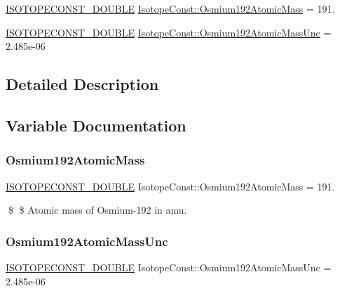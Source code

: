 \begin{DoxyCompactItemize}
\item 
\mbox{\hyperlink{group___isotope_const-_macros_ga8f45a7272ce02c0b4c65c44636ed719a}{I\+S\+O\+T\+O\+P\+E\+C\+O\+N\+S\+T\+\_\+\+D\+O\+U\+B\+LE}} \mbox{\hyperlink{group___isotope_const-_osmium-_os192_ga3ed6412ae8ab9df7c75ac1d47ff50df5}{Isotope\+Const\+::\+Osmium192\+Atomic\+Mass}} = 191.
\item 
\mbox{\hyperlink{group___isotope_const-_macros_ga8f45a7272ce02c0b4c65c44636ed719a}{I\+S\+O\+T\+O\+P\+E\+C\+O\+N\+S\+T\+\_\+\+D\+O\+U\+B\+LE}} \mbox{\hyperlink{group___isotope_const-_osmium-_os192_ga417efdf684d29adf78361748d945714b}{Isotope\+Const\+::\+Osmium192\+Atomic\+Mass\+Unc}} = 2.\+485e-\/06
\end{DoxyCompactItemize}


\subsection{Detailed Description}


\subsection{Variable Documentation}
\mbox{\label{group___isotope_const-_osmium-_os192_ga3ed6412ae8ab9df7c75ac1d47ff50df5}} 
\subsubsection{\texorpdfstring{Osmium192\+Atomic\+Mass}{Osmium192AtomicMass}}
{\footnotesize\ttfamily \mbox{\hyperlink{group___isotope_const-_macros_ga8f45a7272ce02c0b4c65c44636ed719a}{I\+S\+O\+T\+O\+P\+E\+C\+O\+N\+S\+T\+\_\+\+D\+O\+U\+B\+LE}} Isotope\+Const\+::\+Osmium192\+Atomic\+Mass = 191.}

\$ \$ Atomic mass of Osmium-\/192 in amu. \mbox{\label{group___isotope_const-_osmium-_os192_ga417efdf684d29adf78361748d945714b}} 
\subsubsection{\texorpdfstring{Osmium192\+Atomic\+Mass\+Unc}{Osmium192AtomicMassUnc}}
{\footnotesize\ttfamily \mbox{\hyperlink{group___isotope_const-_macros_ga8f45a7272ce02c0b4c65c44636ed719a}{I\+S\+O\+T\+O\+P\+E\+C\+O\+N\+S\+T\+\_\+\+D\+O\+U\+B\+LE}} Isotope\+Const\+::\+Osmium192\+Atomic\+Mass\+Unc = 2.\+485e-\/06}

